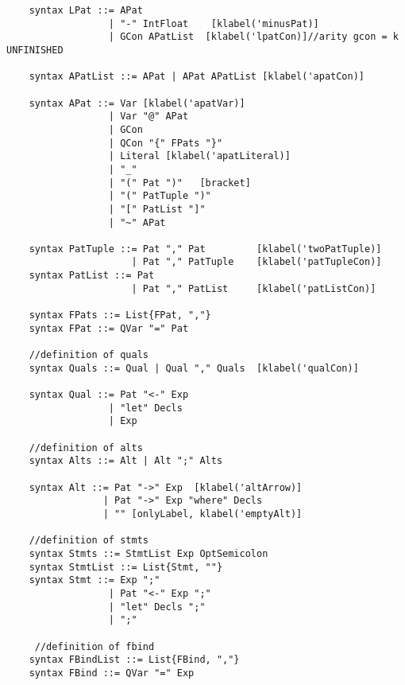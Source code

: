 \begin{lstlisting}
    syntax LPat ::= APat
                  | "-" IntFloat    [klabel('minusPat)]
                  | GCon APatList  [klabel('lpatCon)]//arity gcon = k UNFINISHED

    syntax APatList ::= APat | APat APatList [klabel('apatCon)]

    syntax APat ::= Var [klabel('apatVar)]
                  | Var "@" APat
                  | GCon
                  | QCon "{" FPats "}"
                  | Literal [klabel('apatLiteral)]
                  | "_"
                  | "(" Pat ")"   [bracket]
                  | "(" PatTuple ")"
                  | "[" PatList "]"
                  | "~" APat

    syntax PatTuple ::= Pat "," Pat         [klabel('twoPatTuple)]
                      | Pat "," PatTuple    [klabel('patTupleCon)]
    syntax PatList ::= Pat
                      | Pat "," PatList     [klabel('patListCon)]

    syntax FPats ::= List{FPat, ","}
    syntax FPat ::= QVar "=" Pat

    //definition of quals
    syntax Quals ::= Qual | Qual "," Quals  [klabel('qualCon)]

    syntax Qual ::= Pat "<-" Exp
                  | "let" Decls
                  | Exp

    //definition of alts
    syntax Alts ::= Alt | Alt ";" Alts

    syntax Alt ::= Pat "->" Exp  [klabel('altArrow)]
                 | Pat "->" Exp "where" Decls
                 | "" [onlyLabel, klabel('emptyAlt)]

    //definition of stmts
    syntax Stmts ::= StmtList Exp OptSemicolon
    syntax StmtList ::= List{Stmt, ""}
    syntax Stmt ::= Exp ";"
                  | Pat "<-" Exp ";"
                  | "let" Decls ";"
                  | ";"

     //definition of fbind
    syntax FBindList ::= List{FBind, ","}
    syntax FBind ::= QVar "=" Exp
\end{lstlisting}

